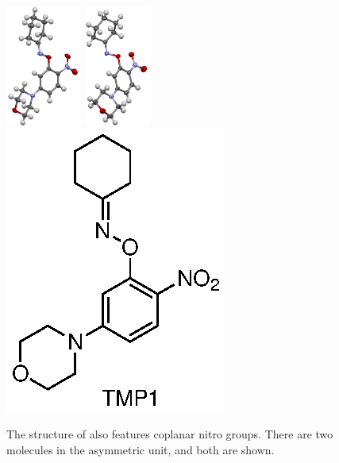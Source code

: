 \begin{refsection}
\begin{figure}
\centering
\includegraphics[height=4cm]{Figures/cyclohexanone-oxime-2n-5mpa.png}
\includegraphics[height=4cm]{Figures/cyclohexanone-oxime-2n-5mpb.png}
\includegraphics[scale=0.8]{Figures/cyclohexanone-oxime-2n-5mp.eps}
\caption[]{The structure of  also features coplanar nitro groups. There are two molecules in the asymmetric unit, and both are shown.}
\label{fig:cyclohexanone-oxime-2n-5mp}
\end{figure}



\printbibliography
\end{refsection}
